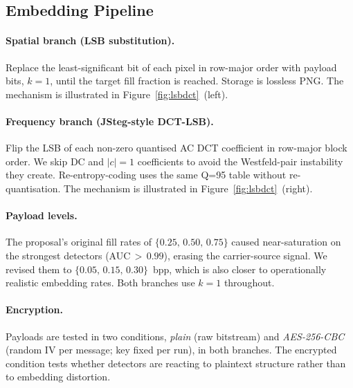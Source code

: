 \documentclass[10pt,twocolumn,a4paper]{article}
\begin{document}
\subsection{Embedding Pipeline}
\label{sec:embedding}

\paragraph{Spatial branch (LSB substitution).} Replace the least-significant bit of each pixel in row-major order with payload bits, $k\!=\!1$, until the target fill fraction is reached. Storage is lossless PNG. The mechanism is illustrated in Figure~\ref{fig:lsbdct}~(left).

\paragraph{Frequency branch (JSteg-style DCT-LSB).} Flip the LSB of each non-zero quantised AC DCT coefficient in row-major block order. We skip DC and $|c|\!=\!1$ coefficients to avoid the Westfeld-pair instability they create. Re-entropy-coding uses the same Q=95 table without re-quantisation. The mechanism is illustrated in Figure~\ref{fig:lsbdct}~(right).

\paragraph{Payload levels.} The proposal's original fill rates of $\{0.25,\,0.50,\,0.75\}$ caused near-saturation on the strongest detectors (AUC$\,>\,0.99$), erasing the carrier-source signal. We revised them to $\{0.05,\,0.15,\,0.30\}$~bpp, which is also closer to operationally realistic embedding rates. Both branches use $k\!=\!1$ throughout.

\paragraph{Encryption.} Payloads are tested in two conditions, \emph{plain} (raw bitstream) and \emph{AES-256-CBC} (random IV per message; key fixed per run), in both branches. The encrypted condition tests whether detectors are reacting to plaintext structure rather than to embedding distortion.
\end{document}
